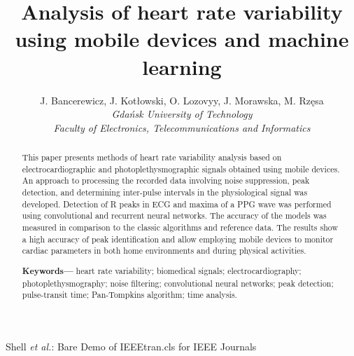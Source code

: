 \documentclass[journal]{IEEEtran}
\begin{document}
\title{Analysis of heart rate variability using mobile devices and machine learning}
\author{
    J. Bancerewicz, J. Kotłowski, O. Lozovyy, J. Morawska, M. Rzęsa\\
    \textit{Gdańsk University of Technology}\\
    \textit{Faculty of Electronics, Telecommunications and Informatics}
}


\markboth{}%
{Shell \MakeLowercase{\textit{et al.}}: Bare Demo of IEEEtran.cls for IEEE Journals}
\maketitle

\begin{abstract}
This paper presents methods of heart rate variability analysis based on electrocardiographic and photoplethysmographic signals obtained using mobile devices. An approach to processing the recorded data involving noise suppression, peak detection, and determining inter-pulse intervals in the physiological signal was developed. Detection of R peaks in ECG and maxima of a PPG wave was performed using convolutional and recurrent neural networks. The accuracy of the models was measured in comparison to the classic algorithms and reference data. The results show a high accuracy of peak identification and allow employing mobile devices to monitor cardiac parameters in both home environments and during physical activities.


\textbf{Keywords---} heart rate variability; biomedical signals; electrocardiography; photoplethysmography; noise filtering; convolutional neural networks; peak detection; pulse-transit time; Pan-Tompkins algorithm; time analysis.
\end{abstract}
\end{document}
